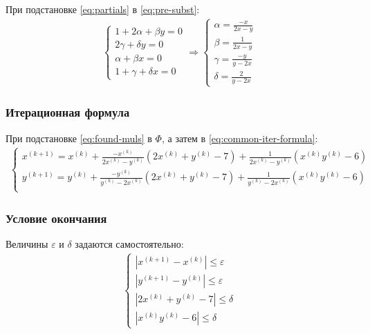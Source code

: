 При подстановке \cref{eq:partials} в \cref{eq:pre-subst}:
\begin{align}\label{eq:found-muls}
	\begin{cases}
		1 + 2 \alpha + \beta y = 0 \\
		2 \gamma + \delta y = 0    \\
		\alpha + \beta x = 0       \\
		1 + \gamma + \delta x = 0
	\end{cases} \Longrightarrow \begin{cases}
		                            \alpha = \frac{-x}{2x - y} \\
		                            \beta = \frac{1}{2x - y}   \\
		                            \gamma = \frac{-y}{y - 2x} \\
		                            \delta = \frac{2}{y - 2x}
	                            \end{cases}
\end{align}

\subsubsection*{Итерационная формула}
При подстановке \cref{eq:found-muls} в \(\Phi\), а затем в \cref{eq:common-iter-formula}:
\begin{align}
	\begin{cases}
		x^{(k + 1)} = x^{(k)} + \frac{-x^{(k)}}{2x^{(k)} - y^{(k)}} (2x^{(k)} + y^{(k)} - 7) + \frac{1}{2x^{(k)}-y^{(k)}} (x^{(k)}y^{(k)} - 6)     \\
		y^{(k + 1)} = y^{(k)} + \frac{-y^{(k)}}{ y^{(k)} - 2x^{(k)} } (2x^{(k)} + y^{(k)} - 7) + \frac{1}{y^{(k)} - 2x^{(k)}} (x^{(k)}y^{(k)} - 6) \\
	\end{cases}
\end{align}
\subsubsection*{Условие окончания}
Величины \(\varepsilon\) и \(\delta\) задаются самостоятельно:
\begin{align}
	\begin{cases}
		|x^{(k+1)} - x^{(k)}| \leq \varepsilon \\
		|y^{(k+1)} - y^{(k)}| \leq \varepsilon \\
		|2x^{(k)} + y^{(k)} - 7| \leq \delta   \\
		|x^{(k)}y^{(k)} - 6| \leq \delta
	\end{cases}
\end{align}

